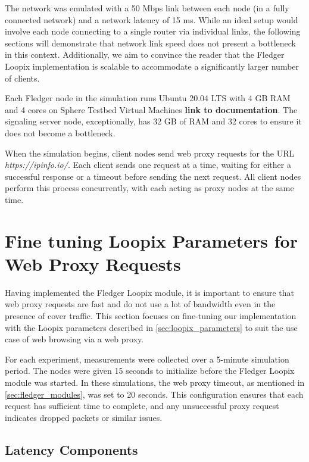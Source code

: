 \documentclass[a4paper,11pt,oneside]{report}
\begin{document}
The network was emulated with a 50 Mbps link between each node (in a fully connected network) and a network latency of 15 ms. While an ideal setup would involve each node connecting to a single router via individual links, the following sections will demonstrate that network link speed does not present a bottleneck in this context. Additionally, we aim to convince the reader that the Fledger Loopix implementation is scalable to accommodate a significantly larger number of clients.

 

Each Fledger node in the simulation runs Ubuntu 20.04 LTS with 4 GB RAM and 4 cores on Sphere Testbed Virtual Machines \textbf{link to documentation}. The signaling server node, exceptionally, has 32 GB of RAM and 32 cores to ensure it does not become a bottleneck.

When the simulation begins, client nodes send web proxy requests for the URL \textit{https://ipinfo.io/}. Each client sends one request at a time, waiting for either a successful response or a timeout before sending the next request. All client nodes perform this process concurrently, with each acting as proxy nodes at the same time.

\section{Fine tuning Loopix Parameters for Web Proxy Requests}
\label{sec:finetune}

Having implemented the Fledger Loopix module, it is important to ensure that web proxy requests are fast and do not use a lot of bandwidth even in the presence of cover traffic. This section focuses on fine-tuning our implementation with the Loopix parameters described in \autoref{sec:loopix_parameters} to suit the use case of web browsing via a web proxy.

For each experiment, measurements were collected over a 5-minute simulation period. The nodes were given 15 seconds to initialize before the Fledger Loopix module was started. In these simulations, the web proxy timeout, as mentioned in \autoref{sec:fledger_modules}, was set to 20 seconds. This configuration ensures that each request has sufficient time to complete, and any unsuccessful proxy request indicates dropped packets or similar issues.

\subsection{Latency Components}
\end{document}
